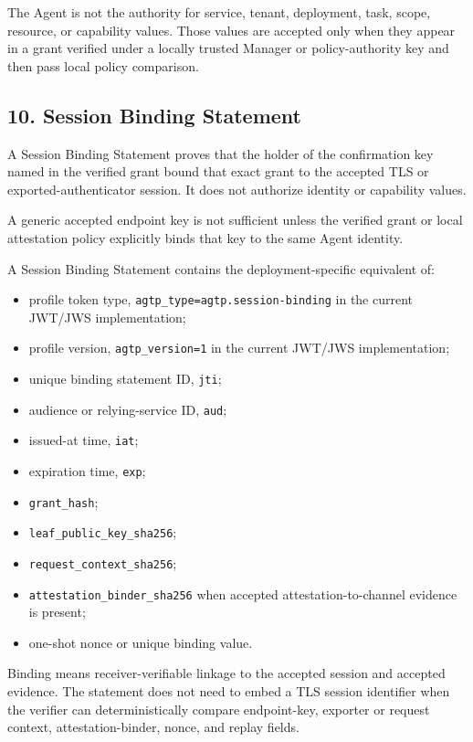 \documentclass[
]{article}
\providecommand{\tightlist}{%
  \setlength{\itemsep}{0pt}\setlength{\parskip}{0pt}}
\begin{document}
The Agent is not the authority for service, tenant, deployment, task,
scope, resource, or capability values. Those values are accepted only
when they appear in a grant verified under a locally trusted Manager or
policy-authority key and then pass local policy comparison.

\subsection{10. Session Binding
Statement}\label{session-binding-statement}

A Session Binding Statement proves that the holder of the confirmation
key named in the verified grant bound that exact grant to the accepted
TLS or exported-authenticator session. It does not authorize identity or
capability values.

A generic accepted endpoint key is not sufficient unless the verified
grant or local attestation policy explicitly binds that key to the same
Agent identity.

A Session Binding Statement contains the deployment-specific equivalent
of:

\begin{itemize}
\tightlist
\item
  profile token type, \texttt{agtp\_type=agtp.session-binding} in the
  current JWT/JWS implementation;
\item
  profile version, \texttt{agtp\_version=1} in the current JWT/JWS
  implementation;
\item
  unique binding statement ID, \texttt{jti};
\item
  audience or relying-service ID, \texttt{aud};
\item
  issued-at time, \texttt{iat};
\item
  expiration time, \texttt{exp};
\item
  \texttt{grant\_hash};
\item
  \texttt{leaf\_public\_key\_sha256};
\item
  \texttt{request\_context\_sha256};
\item
  \texttt{attestation\_binder\_sha256} when accepted
  attestation-to-channel evidence is present;
\item
  one-shot nonce or unique binding value.
\end{itemize}

Binding means receiver-verifiable linkage to the accepted session and
accepted evidence. The statement does not need to embed a TLS session
identifier when the verifier can deterministically compare endpoint-key,
exporter or request context, attestation-binder, nonce, and replay
fields.
\end{document}
